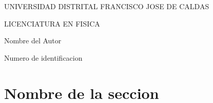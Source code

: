 \documentclass[10pt,a4paper]{article}
\author{Nombre del Autor}
\begin{document}

\begin{center}
UNIVERSIDAD DISTRITAL FRANCISCO JOSE DE CALDAS
\end{center}


\begin{center}
LICENCIATURA EN FISICA
\end{center}


\begin{center}
Nombre del Autor
\end{center}


\begin{center}
Numero de identificacion
\end{center}



\section{Nombre de la seccion}  	
\label{sec1} %

\end{document}
